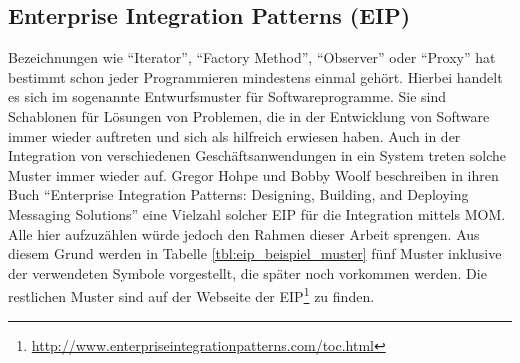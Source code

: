 
\subsection{Enterprise Integration Patterns (EIP)} %
\label{sub:enterprise_integration_pattern}

Bezeichnungen wie \enquote{Iterator}, \enquote{Factory Method}, \enquote{Observer} oder \enquote{Proxy} hat bestimmt schon jeder Programmieren mindestens einmal gehört. Hierbei handelt es sich im sogenannte Entwurfsmuster für Softwareprogramme. Sie sind Schablonen für Lösungen von Problemen, die in der Entwicklung von Software immer wieder auftreten und sich als hilfreich erwiesen haben. Auch in der Integration von verschiedenen Geschäftsanwendungen in ein System treten solche Muster immer wieder auf. Gregor Hohpe und Bobby Woolf beschreiben in ihren Buch \enquote{Enterprise Integration Patterns: Designing, Building, and Deploying Messaging Solutions}\cite{Hohpe:2003:EIP:940308} eine Vielzahl solcher EIP für die Integration mittels MOM. Alle hier aufzuzählen würde jedoch den Rahmen dieser Arbeit sprengen. Aus diesem Grund werden in Tabelle \ref{tbl:eip_beispiel_muster} fünf Muster inklusive der verwendeten Symbole vorgestellt, die später noch vorkommen werden. Die restlichen Muster sind auf der Webseite der EIP\footnote{\url{http://www.enterpriseintegrationpatterns.com/toc.html}} zu finden.

